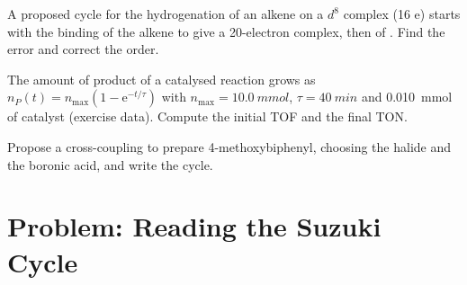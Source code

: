 \begin{exercise}[$\star\star\star$]\label{exo:b2:catalytic-cycles:10}
A proposed cycle for the hydrogenation of an alkene on a $d^8$ complex  (16 e)
starts with the binding of the alkene to give a 20-electron complex, then 
of . Find the error and correct the order.
\end{exercise}

\begin{exercise}[$\star\star\star$]\label{exo:b2:catalytic-cycles:11}
The amount of product of a catalysed reaction grows as $n_P(t) = n_{\max}(1 - \mathrm e^{-t/\tau})$
with $n_{\max} = \qty{10.0}{mmol}$, $\tau = \qty{40}{min}$ and \qty{0.010}{mmol} of catalyst
(exercise data). Compute the initial TOF and the final TON.
\end{exercise}

\begin{exercise}[$\star\star\star$]\label{exo:b2:catalytic-cycles:12}
Propose a cross-coupling to prepare 4-methoxybiphenyl, choosing the halide and the boronic
acid, and write the cycle.
\end{exercise}

\section{Problem: Reading the Suzuki Cycle}

